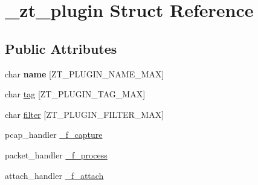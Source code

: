 \hypertarget{struct__zt__plugin}{\section{\-\_\-zt\-\_\-plugin Struct Reference}
\label{struct__zt__plugin}
}
\subsection*{Public Attributes}
\begin{DoxyCompactItemize}
\item 
\hypertarget{struct__zt__plugin_ac51228defdc37fcedff2e516e5acbfde}{char {\bfseries name} \mbox{[}Z\-T\-\_\-\-P\-L\-U\-G\-I\-N\-\_\-\-N\-A\-M\-E\-\_\-\-M\-A\-X\mbox{]}}\label{struct__zt__plugin_ac51228defdc37fcedff2e516e5acbfde}

\item 
char \hyperlink{struct__zt__plugin_a7e9fac40f4abc315830dfd6e26d34f02}{tag} \mbox{[}Z\-T\-\_\-\-P\-L\-U\-G\-I\-N\-\_\-\-T\-A\-G\-\_\-\-M\-A\-X\mbox{]}
\item 
char \hyperlink{struct__zt__plugin_a2951bf9c0af74765eddda67233ac1d60}{filter} \mbox{[}Z\-T\-\_\-\-P\-L\-U\-G\-I\-N\-\_\-\-F\-I\-L\-T\-E\-R\-\_\-\-M\-A\-X\mbox{]}
\item 
pcap\-\_\-handler \hyperlink{struct__zt__plugin_ae71982396032d7e0f8326ed7885d1656}{\-\_\-f\-\_\-capture}
\item 
packet\-\_\-handler \hyperlink{struct__zt__plugin_af170e5b42e6100cd381a616437e4b1c4}{\-\_\-f\-\_\-process}
\item 
attach\-\_\-handler \hyperlink{struct__zt__plugin_ab646717ba0f01fb4aee918e7d5246c51}{\-\_\-f\-\_\-attach}
\end{DoxyCompactItemize}


